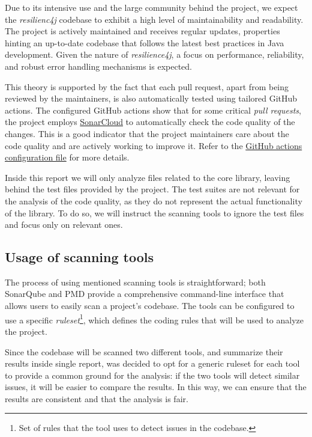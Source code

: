 Due to its intensive use and the large community behind the project, we expect the \textit{resilienc4j} codebase to exhibit a high level of maintainability and readability. The project is actively maintained and receives regular updates, properties hinting an up-to-date codebase that follows the latest best practices in Java development. Given the nature of \textit{resilience4j}, a focus on performance, reliability, and robust error handling mechanisms is expected.

This theory is supported by the fact that each pull request, apart from being reviewed by the maintainers, is also automatically tested using tailored GitHub actions. The configured GitHub actions show that for some critical \textit{pull requests}, the project employs \href{https://sonarcloud.io/}{SonarCloud} to automatically check the code quality of the changes. This is a good indicator that the project maintainers care about the code quality and are actively working to improve it. Refer to the \href{https://github.com/resilience4j/resilience4j/blob/master/.github/workflows/gradle-build.yml#L54}{GitHub actions configuration file} for more details.

Inside this report we will only analyze files related to the core library, leaving behind the test files provided by the project. The test suites are not relevant for the analysis of the code quality, as they do not represent the actual functionality of the library. To do so, we will instruct the scanning tools to ignore the test files and focus only on relevant ones.

\subsection{Usage of scanning tools}

The process of using mentioned scanning tools is straightforward; both SonarQube and PMD provide a comprehensive command-line interface that allows users to easily scan a project's codebase. The tools can be configured to use a specific \textit{ruleset}\footnote{Set of rules that the tool uses to detect issues in the codebase.}, which defines the coding rules that will be used to analyze the project.

Since the codebase will be scanned two different tools, and summarize their results inside single report, was decided to opt for a generic ruleset for each tool to provide a common ground for the analysis: if the two tools will detect similar issues, it will be easier to compare the results. In this way, we can ensure that the results are consistent and that the analysis is fair.

